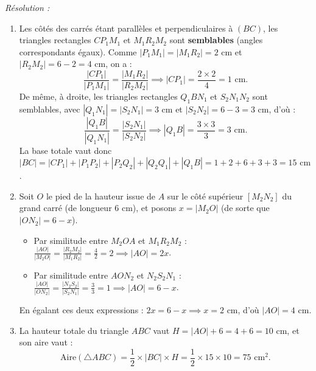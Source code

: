 \begin{exemple}
\begin{center}
\end{center}
\emph{Résolution :}
\begin{enumerate}[label=(\alph*)]
    \item Les côtés des carrés étant parallèles et perpendiculaires à $(BC)$, les triangles rectangles $C P_1 M_1$ et $M_1 R_2 M_2$ sont \textbf{semblables} (angles correspondants égaux). Comme $|P_1 M_1| = |M_1 R_2| = 2\text{ cm}$ et $|R_2 M_2| = 6 - 2 = 4\text{ cm}$, on a :
    \[
        \frac{|CP_1|}{|P_1 M_1|} = \frac{|M_1 R_2|}{|R_2 M_2|} \implies |CP_1| = \frac{2 \times 2}{4} = 1\text{ cm}.
    \]
    De même, à droite, les triangles rectangles $Q_1 B N_1$ et $S_2 N_1 N_2$ sont semblables, avec $|Q_1 N_1| = |S_2 N_1| = 3\text{ cm}$ et $|S_2 N_2| = 6 - 3 = 3\text{ cm}$, d'où :
    \[
        \frac{|Q_1 B|}{|Q_1 N_1|} = \frac{|S_2 N_1|}{|S_2 N_2|} \implies |Q_1 B| = \frac{3 \times 3}{3} = 3\text{ cm}.
    \]
    La base totale vaut donc $|BC| = |CP_1| + |P_1 P_2| + |P_2 Q_2| + |Q_2 Q_1| + |Q_1 B| = 1 + 2 + 6 + 3 + 3 = \boxed{15\text{ cm}}$.
    \item Soit $O$ le pied de la hauteur issue de $A$ sur le côté supérieur $[M_2 N_2]$ du grand carré (de longueur $6\text{ cm}$), et posons $x = |M_2 O|$ (de sorte que $|O N_2| = 6 - x$).
    \begin{itemize}
        \item Par similitude entre $M_2 O A$ et $M_1 R_2 M_2$ : $\frac{|AO|}{|M_2 O|} = \frac{|R_2 M_2|}{|M_1 R_2|} = \frac{4}{2} = 2 \implies |AO| = 2x$.
        \item Par similitude entre $A O N_2$ et $N_2 S_2 N_1$ : $\frac{|AO|}{|O N_2|} = \frac{|N_2 S_2|}{|S_2 N_1|} = \frac{3}{3} = 1 \implies |AO| = 6 - x$.
    \end{itemize}
    En égalant ces deux expressions : $2x = 6 - x \implies x = 2\text{ cm}$, d'où $|AO| = 4\text{ cm}$.
    \item La hauteur totale du triangle $ABC$ vaut $H = |AO| + 6 = 4 + 6 = 10\text{ cm}$, et son aire vaut :
    \[
        \text{Aire}(\triangle ABC) = \frac{1}{2} \times |BC| \times H = \frac{1}{2} \times 15 \times 10 = \boxed{75\text{ cm}^2}.
    \]
\end{enumerate}


\end{exemple}
